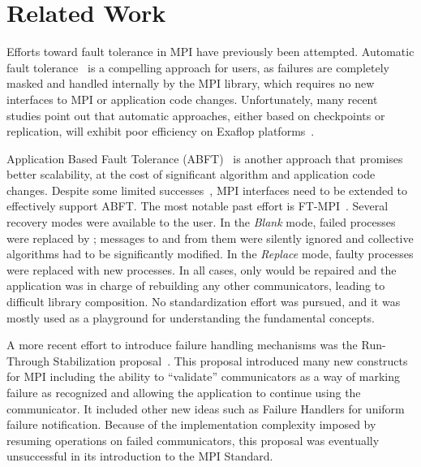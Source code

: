 \section{Related Work}
\label{sect:related}

Efforts toward fault tolerance in MPI have previously been attempted.  Automatic
fault tolerance~\cite{Bouteiller10Redesign,MPICHVblocking} is a compelling
approach for users, as failures are completely masked and handled internally by
the MPI library, which requires no new interfaces to MPI or application code
changes. Unfortunately, many recent studies point out that automatic approaches,
either based on checkpoints or replication, will exhibit poor efficiency on
Exaflop platforms~\cite{BOSILCA-2012-696154,lawn265}.

Application Based Fault Tolerance
(ABFT)~\cite{fthpl2011,pengduppopp12,huang1984algorithm} is another approach
that promises better scalability, at the cost of significant algorithm and application code changes. 
Despite some limited successes~\cite{europar12/onfailureckpt,Gropp:2004:FTM:1080704.1080714},
MPI interfaces need to be extended to effectively support ABFT. 
The most notable past effort is
FT-MPI~\cite{fagg2000ft}. Several recovery modes were available to the user. In
the \emph{Blank} mode, failed processes were replaced by
; messages to and from them were silently ignored and
collective algorithms had to be significantly modified.
In the \emph{Replace} mode, faulty processes were replaced with new
processes. In all cases, only  would be repaired and
the application was in charge of rebuilding any other communicators, leading to
difficult library composition. No standardization effort was pursued, and
it was mostly used as a playground for understanding the
fundamental concepts.

A more recent effort to introduce failure handling mechanisms was the
Run-Through Stabilization proposal~\cite{Hursey11MPI3FT}.
This proposal introduced many new constructs for MPI including the ability to
``validate'' communicators as a way of marking failure as recognized and
allowing the application to continue using the communicator. It included other
new ideas such as Failure Handlers for uniform failure notification. Because
of the implementation complexity imposed by resuming
operations on failed communicators, this proposal was eventually unsuccessful in
its introduction to the MPI Standard.

